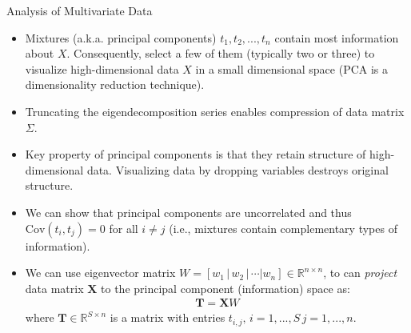 \documentclass[9pt]{beamer}
\begin{document}
\begin{frame}{Analysis of Multivariate Data}

\begin{itemize}
\item Mixtures (a.k.a. principal components) $t_1,t_2,...,t_n$ contain most information about $X$. Consequently, select a few of them (typically two or three) to visualize high-dimensional data $X$ in a small dimensional space (PCA is a dimensionality reduction technique). 

\item Truncating the eigendecomposition series enables compression of data matrix $\Sigma$. 

\item Key property of principal components is that they retain structure of high-dimensional data. Visualizing data by dropping variables destroys original structure.

\item We can show that principal components are uncorrelated and thus $\textrm{Cov}(t_i,t_j)=0$ for all $i\neq j$ (i.e., mixtures contain complementary types of information). 

\item We can use eigenvector matrix $W=[w_1\,|\,w_2\,|\,\cdots|w_n]\in \mathbb{R}^{n\times n}$, to can {\em project} data matrix $\mathbf{X}$ to the principal component (information) space as: 
\begin{align*}
\mathbf{T}=\mathbf{X}W
\end{align*}
where $\mathbf{T}\in \mathbb{R}^{S\times n}$ is a matrix with entries $t_{i,j},\,i=1,...,S\, j=1,...,n$. 

 
\end{itemize}


\end{frame}


\end{document}
